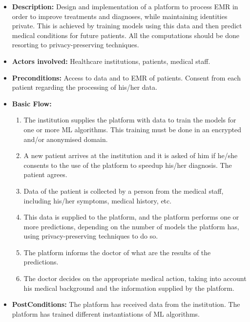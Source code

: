 \begin{itemize}
	\setlength\itemsep{1em}

	\item \textbf{Description:} Design and implementation of a platform to process \ac{EMR} in order to improve treatments and diagnoses, while maintaining identities private. This is achieved by training models using this data and then predict medical conditions for future patients. All the computations should be done resorting to privacy-preserving techniques.

	\item \textbf{Actors involved:} Healthcare institutions, patients, medical staff.

	\item \textbf{Preconditions:} Access to data and to \ac{EMR} of patients. Consent from each patient regarding the processing of his/her data.

	\item \textbf{Basic Flow:} 
	
	\begin{enumerate}
		\item The institution supplies the platform with data to train the models for one or more \ac{ML} algorithms. This training must be done in an encrypted and/or anonymised domain.

		\item A new patient arrives at the institution and it is asked of him if he/she consents to the use of the platform to speedup his/her diagnosis. The patient agrees.

		\item Data of the patient is collected by a person from the medical staff, including his/her symptoms, medical history, etc.

		\item This data is supplied to the platform, and the platform performs one or more predictions, depending on the number of models the platform has, using privacy-preserving techniques to do so.

		\item The platform informs the doctor of what are the results of the predictions.

		\item The doctor decides on the appropriate medical action, taking into account his medical background and the information supplied by the platform.


	\end{enumerate}

	\item \textbf{PostConditions:} The platform has received data from the institution. The platform has trained different instantiations of \ac{ML} algorithms.

\end{itemize}





